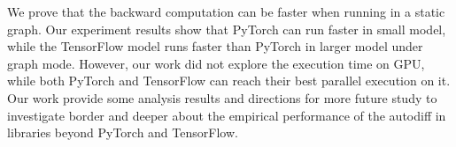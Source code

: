 \documentclass[12pt,twocolumn,letterpaper]{extarticle}
\begin{document}
We prove that the backward computation can be faster when running in a static graph. Our experiment results show that PyTorch can run faster in small model, while the TensorFlow model runs faster than PyTorch in larger model under graph mode. However, our work did not explore the execution time on GPU, while both PyTorch and TensorFlow can reach their best parallel execution on it. Our work provide some analysis results and directions for more future study to investigate border and deeper about the empirical performance of the autodiff in libraries beyond PyTorch and TensorFlow.

\newpage
\clearpage


\end{document}
